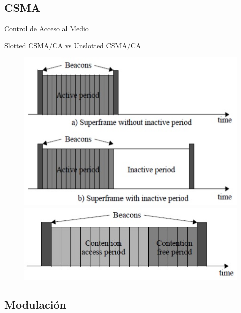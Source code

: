 \documentclass[aspectratio=169]{beamer}
\begin{document}
\subsection[CSMA]{CSMA}

\begin{frame}[T]{Control de Acceso al Medio}

Slotted CSMA/CA vs Unslotted CSMA/CA
\vspace{10px}
		\begin{figure}[H]
			\includegraphics[height=.4\textheight]{./imagenes/superframe.jpg}\\
			\vspace{15px}
			\includegraphics[height=.3\textheight]{./imagenes/unsolotted.jpg}
		\end{figure}
\end{frame}

\subsection[Modulación]{Modulación}
\end{document}
